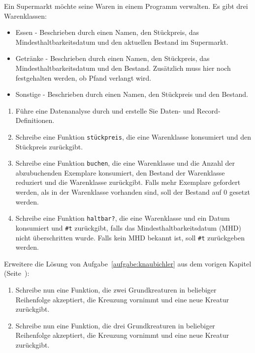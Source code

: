 \begin{aufgabe}
  Ein Supermarkt möchte seine Waren in einem Programm verwalten. Es gibt
  drei Warenklassen:
  \begin{itemize}
  \item Essen - Beschrieben durch einen Namen, den Stückpreis, das Mindesthaltbarkeitsdatum
    und den aktuellen Bestand im Supermarkt.
  \item Getränke - Beschrieben durch einen Namen, den Stückpreis, das Mindesthaltbarkeitsdatum
    und den Bestand. Zusätzlich muss hier noch festgehalten werden, ob Pfand verlangt wird.
  \item Sonstige - Beschrieben durch einen Namen, den Stückpreis und den Bestand.
  \end{itemize}

  
  \begin{enumerate}
  \item Führe eine Datenanalyse durch und erstelle Sie Daten- und 
    Record-Definitionen.
  \item Schreibe eine Funktion \texttt{stückpreis}, die eine Warenklasse
    konsumiert und den Stückpreis zurückgibt.
  \item Schreibe eine Funktion \texttt{buchen}, die eine Warenklasse und die Anzahl der
    abzubuchenden Exemplare konsumiert, den Bestand der Warenklasse reduziert und die
    Warenklasse zurückgibt. Falls mehr Exemplare gefordert werden, als in der Warenklasse
    vorhanden sind, soll der Bestand auf 0 gesetzt werden.
  \item Schreibe eine Funktion \texttt{haltbar?}, die eine
    Warenklasse und ein Datum konsumiert und \texttt{\#t} zurückgibt, falls das
    Mindesthaltbarkeitsdatum (MHD) nicht überschritten wurde. Falls kein MHD bekannt ist,
    soll \texttt{\#t} zurückgeben werden.
  \end{enumerate}
\end{aufgabe}

\begin{aufgabe}
  \label{aufgabe:knaubichler2}
  Erweitere die Lösung von Aufgabe~\ref{aufgabe:knaubichler} aus
  dem vorigen Kapitel (Seite~\pageref{aufgabe:knaubichler}):
  
  \begin{enumerate}
  \item Schreibe nun eine Funktion, die zwei
    Grundkreaturen in beliebiger Reihenfolge akzeptiert, die Kreuzung
    vornimmt und eine neue Kreatur zurückgibt.
    
  \item Schreibe nun eine
    Funktion, die drei Grundkreaturen in beliebiger Reihenfolge
    akzeptiert, die Kreuzung vornimmt und eine neue Kreatur
    zurückgibt.
  \end{enumerate}
\end{aufgabe}     

